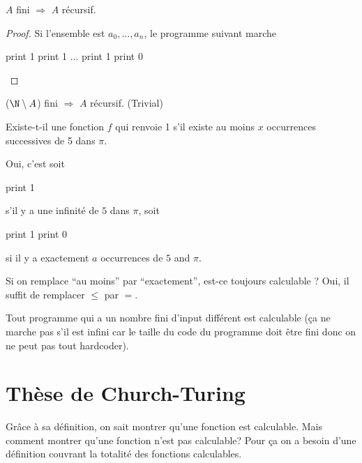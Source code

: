 \begin{myprop}
	$A$ fini $\Rightarrow$ $A$ récursif.
    \begin{proof}
      Si l'ensemble est $a_0, \ldots, a_n$, le programme suivant marche
      \begin{algorithmic}
        \STATE print 1
        \STATE print 1
        \STATE ...
        \STATE print 1
        \ELSE
        \STATE print 0
        \ENDIF
      \end{algorithmic}
    \end{proof}
\end{myprop}

\begin{myprop}
	($\N \setminus A$) fini $\Rightarrow$ $A$ récursif. (Trivial)
\end{myprop}

\begin{myexem}
  Existe-t-il une fonction $f$ qui renvoie 1 s'il existe au moins $x$ occurrences successives de 5 dans $\pi$.

  Oui, c'est soit
  \begin{algorithmic}
    \STATE print 1
  \end{algorithmic}
  s'il y a une infinité de $5$ dans $\pi$,
  soit
  \begin{algorithmic}
    \STATE print 1
    \ELSE
    \STATE print 0
    \ENDIF
  \end{algorithmic}
  si il y a exactement $a$ occurrences de $5$ and $\pi$.

  Si on remplace ``au moins'' par ``exactement'', est-ce toujours calculable ?
  Oui, il suffit de remplacer $\leq$ par $=$.
\end{myexem}

\begin{myprop}
  Tout programme qui a un nombre fini d'input différent est calculable (ça ne marche pas s'il est infini car le taille du code du programme doit être fini donc on ne peut pas tout hardcoder).
\end{myprop}


\section{Thèse de Church-Turing}
\label{sec:th_se_de_church_turing}
Grâce à sa définition, on sait montrer qu'une fonction est calculable. Mais comment
montrer qu'une fonction n'est pas calculable? Pour ça on a besoin d'une définition
couvrant la totalité des fonctions calculables.

